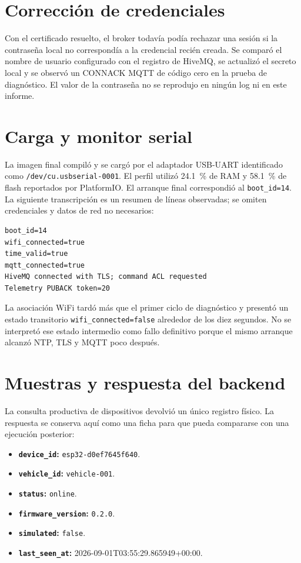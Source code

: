 \documentclass[10pt,a4paper]{article}
\newcommand{\code}[1]{\texttt{\small #1}}
\begin{document}
\section{Corrección de credenciales}

Con el certificado resuelto, el broker todavía podía rechazar una sesión si la
contraseña local no correspondía a la credencial recién creada. Se comparó el
nombre de usuario configurado con el registro de HiveMQ, se actualizó el secreto
local y se observó un CONNACK MQTT de código cero en la prueba de diagnóstico.
El valor de la contraseña no se reprodujo en ningún log ni en este informe.

\section{Carga y monitor serial}

La imagen final compiló y se cargó por el adaptador USB-UART identificado como
\code{/dev/cu.usbserial-0001}. El perfil utilizó 24.1~\% de RAM y 58.1~\% de
flash reportados por PlatformIO. El arranque final correspondió al
\code{boot\_id=14}. La siguiente transcripción es un resumen de líneas
observadas; se omiten credenciales y datos de red no necesarios:

\begin{lstlisting}
boot_id=14
wifi_connected=true
time_valid=true
mqtt_connected=true
HiveMQ connected with TLS; command ACL requested
Telemetry PUBACK token=20
\end{lstlisting}

La asociación WiFi tardó más que el primer ciclo de diagnóstico y presentó un
estado transitorio \code{wifi\_connected=false} alrededor de los diez segundos.
No se interpretó ese estado intermedio como fallo definitivo porque el mismo
arranque alcanzó NTP, TLS y MQTT poco después.

\section{Muestras y respuesta del backend}

La consulta productiva de dispositivos devolvió un único registro físico. La
respuesta se conserva aquí como una ficha para que pueda compararse con una
ejecución posterior:

\begin{itemize}[leftmargin=0pt,label={}]
  \item \textbf{\code{device\_id}:} \code{esp32-d0ef7645f640}.
  \item \textbf{\code{vehicle\_id}:} \code{vehicle-001}.
  \item \textbf{\code{status}:} \code{online}.
  \item \textbf{\code{firmware\_version}:} \code{0.2.0}.
  \item \textbf{\code{simulated}:} \code{false}.
  \item \textbf{\code{last\_seen\_at}:} 2026-09-01T03:55:29.865949+00:00.
\end{itemize}
\end{document}
